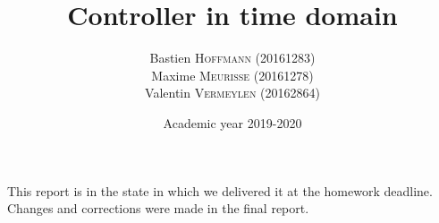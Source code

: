 \documentclass[a4paper, 12pt]{article}
\title{Controller in time domain}
\author{
    Bastien \textsc{Hoffmann} (20161283)\\
    Maxime \textsc{Meurisse} (20161278)\\
    Valentin \textsc{Vermeylen} (20162864)\\
}
\date{Academic year 2019-2020}
\begin{document}
    
    
    \begin{rmk}
        This report is in the state in which we delivered it at the homework deadline. Changes and corrections were made in the final report.
    \end{rmk}
    
    
    
    
    
    
    
    
    
    
\end{document}
